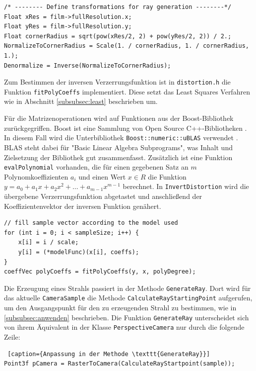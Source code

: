 \begin{lstlisting}[caption={Transformation zur Normalisierung der Pixelkoordinaten}]
/* -------- Define transformations for ray generation --------*/
Float xRes = film->fullResolution.x;
Float yRes = film->fullResolution.y;
Float cornerRadius = sqrt(pow(xRes/2, 2) + pow(yRes/2, 2)) / 2.;
NormalizeToCornerRadius = Scale(1. / cornerRadius, 1. / cornerRadius, 1.);
Denormalize = Inverse(NormalizeToCornerRadius);
\end{lstlisting}


Zum Bestimmen der inversen Verzerrungsfunktion ist in \texttt{distortion.h} die Funktion \texttt{fitPolyCoeffs} implementiert. Diese setzt das Least Squares Verfahren wie in Abschnitt \ref{subsubsec:least} beschrieben um.

Für die Matrizenoperationen wird auf Funktionen aus der Boost-Bibliothek zurückgegriffen. Boost ist eine Sammlung von Open Source C++-Bibliotheken \cite{boost}. In diesem Fall wird die Unterbibliothek \texttt{Boost::numeric::uBLAS} verwendet \cite{ublas}. BLAS steht dabei für "Basic Linear Algebra Subprograms", was Inhalt und Zielsetzung der Bibliothek gut zusammenfasst. Zusätzlich ist eine Funktion \texttt{evalPolynomial} vorhanden, die für einen gegebenen Satz an $m$ Polynomkoeffizienten $a_i$ und einen Wert $x \in R$ die Funktion $y = a_0 + a_1 x + a_2 x^2 + \dots + a_{m-1} x^{m-1}$ berechnet. In \texttt{InvertDistortion} wird die übergebene Verzerrungsfunktion abgetastet und anschließend der Koeffizientenvektor der inversen Funktion genähert.

\begin{lstlisting}[caption={"Abtasten" des Verzerrungsmodells und Invertierung}]
// fill sample vector according to the model used
for (int i = 0; i < sampleSize; i++) {
	x[i] = i / scale;
	y[i] = (*modelFunc)(x[i], coeffs);
}
coeffVec polyCoeffs = fitPolyCoeffs(y, x, polyDegree);
\end{lstlisting}

Die Erzeugung eines Strahls passiert in der Methode \texttt{GenerateRay}. Dort wird für das aktuelle \texttt{CameraSample} die Methode \texttt{CalculateRayStartingPoint} aufgerufen, um den Ausgangspunkt für den zu erzeugenden Strahl zu bestimmen, wie in \ref{subsubsec:anwenden} beschrieben.
Die Funktion \texttt{GenerateRay} unterscheidet sich von ihrem Äquivalent in der Klasse \texttt{PerspectiveCamera} nur durch die folgende Zeile:
\begin{lstlisting} [caption={Anpassung in der Methode \texttt{GenerateRay}}]
Point3f pCamera = RasterToCamera(CalculateRayStartpoint(sample));
\end{lstlisting}

